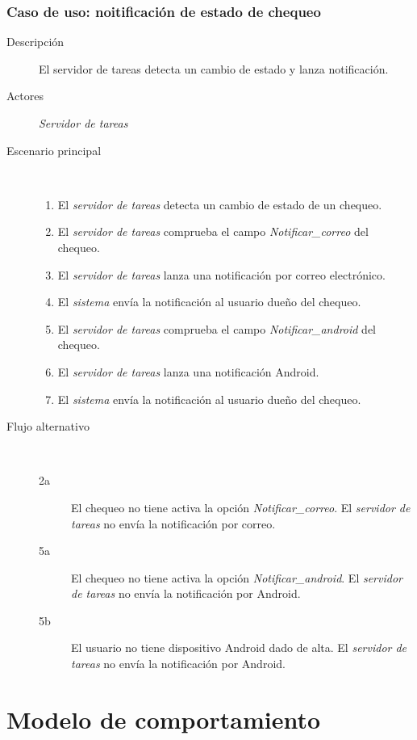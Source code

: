 \subsubsection{Caso de uso: noitificación de estado de chequeo}

\begin{description}
\item[Descripción] El servidor de tareas detecta un cambio de estado y lanza notificación.
\item[Actores] \textit{Servidor de tareas}
\item[Escenario principal] $\quad$
  \begin{enumerate}
  \item El \textit{servidor de tareas} detecta un cambio de estado de un chequeo.
  \item El \textit{servidor de tareas} comprueba el campo
    \textit{Notificar\_correo} del chequeo.
  \item El \textit{servidor de tareas} lanza una notificación por correo electrónico.
  \item El \textit{sistema} envía la notificación al usuario dueño del chequeo.

  \item El \textit{servidor de tareas} comprueba el campo
    \textit{Notificar\_android} del chequeo.
  \item El \textit{servidor de tareas} lanza una notificación Android.
  \item El \textit{sistema} envía la notificación al usuario dueño del chequeo.

  \end{enumerate}
\item[Flujo alternativo] $\quad$
  \begin{description}
  \item[2a] El chequeo no tiene activa la opción \textit{Notificar\_correo}. El
    \textit{servidor de tareas} no envía la notificación por correo.
  \item[5a] El chequeo no tiene activa la opción \textit{Notificar\_android}. El
    \textit{servidor de tareas} no envía la notificación por Android.
  \item[5b] El usuario no tiene dispositivo Android dado de alta. El
    \textit{servidor de tareas} no envía la notificación por Android.
  \end{description}
\end{description}

\section{Modelo de comportamiento}

